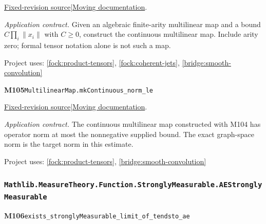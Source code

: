 \documentclass[11pt,a4paper]{article}
\theoremstyle{definition}
\theoremstyle{remark}
\begin{document}
\href{https://github.com/leanprover-community/mathlib4/blob/9bac2d0692944a775113f7c130fd5e5b4608a854/Mathlib/Analysis/Normed/Module/Multilinear/Basic.lean}{Fixed-revision source}\quad|\quad\href{https://leanprover-community.github.io/mathlib4_docs/Mathlib/Analysis/Normed/Module/Multilinear/Basic.html#MultilinearMap.mkContinuous}{Moving documentation}.\par
\noindent\textit{Application contract.} Given an algebraic finite-arity multilinear map and a bound $C\prod_i\|x_i\|$ with $C\geq0$, construct the continuous multilinear map. Include arity zero; formal tensor notation alone is not such a map.\par
{\small Project uses: \ref{fock:product-tensors}, \ref{fock:coherent-jets}, \ref{bridge:smooth-convolution}}\par\medskip

\noindent\textbf{M105}\label{base:M105}\quad\nolinkurl{MultilinearMap.mkContinuous_norm_le}

\href{https://github.com/leanprover-community/mathlib4/blob/9bac2d0692944a775113f7c130fd5e5b4608a854/Mathlib/Analysis/Normed/Module/Multilinear/Basic.lean}{Fixed-revision source}\quad|\quad\href{https://leanprover-community.github.io/mathlib4_docs/Mathlib/Analysis/Normed/Module/Multilinear/Basic.html#MultilinearMap.mkContinuous_norm_le}{Moving documentation}.\par
\noindent\textit{Application contract.} The continuous multilinear map constructed with M104 has operator norm at most the nonnegative supplied bound. The exact graph-space norm is the target norm in this estimate.\par
{\small Project uses: \ref{fock:product-tensors}, \ref{bridge:smooth-convolution}}\par\medskip

\subsubsection*{\nolinkurl{Mathlib.MeasureTheory.Function.StronglyMeasurable.AEStronglyMeasurable}}
\noindent\textbf{M106}\label{base:M106}\quad\nolinkurl{exists_stronglyMeasurable_limit_of_tendsto_ae}
\end{document}
